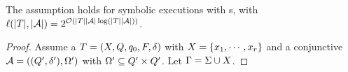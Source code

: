 \begin{lemma}\label{lem-2pt}
The \prerec{} assumption holds for symbolic executions with \PPT{}s, with $\ell(|T|, |\mathcal{A}|) = 2^{\mathcal{O}(|T||\mathcal{A}|\log (|T||\mathcal{A}|))}$.
\end{lemma}

\begin{proof}
Assume a \PPT{} $T=(X, Q, q_0, F, \delta)$ with $X = \{x_1,\cdots, x_r\}$ and a conjunctive \FA{} $\mathcal{A} = ((Q', \delta'), \Omega')$ with $\Omega' \subseteq Q' \times Q'$. %
Let $\Gamma = \Sigma \cup X$.


\end{proof}
